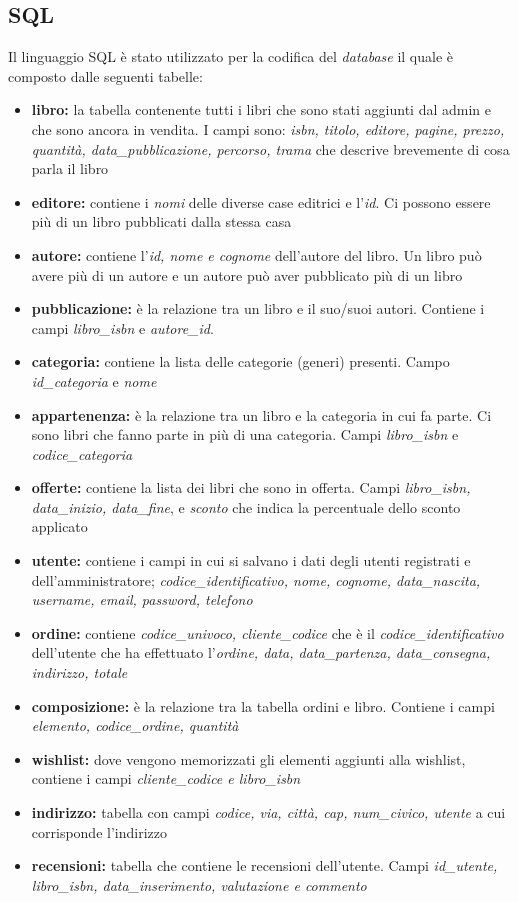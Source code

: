 \subsection{SQL}
Il linguaggio SQL è stato utilizzato per la codifica del \textit{database} il quale è composto dalle seguenti tabelle:
\begin{itemize}
	\item \textbf{libro:} la tabella contenente tutti i libri che sono stati aggiunti dal admin e che sono ancora in vendita. I campi sono: \textit{isbn, titolo, editore, pagine, prezzo, quantità, data\_pubblicazione, percorso, trama} che descrive brevemente di cosa parla il libro
	\item \textbf{editore:} contiene i \textit{nomi} delle diverse case editrici e l’\textit{id}. Ci possono essere più di un libro pubblicati dalla stessa casa
	\item \textbf{autore:} contiene l’\textit{id, nome e cognome} dell'autore del libro. Un libro può avere più di un autore e un autore può aver pubblicato più di un libro
	\item \textbf{pubblicazione:} è la relazione tra un libro e il suo/suoi autori. Contiene i campi \textit{libro\_isbn} e \textit{autore\_id}.
	\item \textbf{categoria:} contiene la lista delle categorie (generi) presenti. Campo \textit{id\_categoria} e \textit{nome}
	\item \textbf{appartenenza:} è la relazione tra un libro e la categoria in cui fa parte. Ci sono libri che fanno parte in più di una categoria. Campi \textit{libro\_isbn} e \textit{codice\_categoria}
	\item \textbf{offerte:} contiene la lista dei libri che sono in offerta. Campi \textit{libro\_isbn, data\_inizio, data\_fine}, e \textit{sconto} che indica la percentuale dello sconto applicato
	\item \textbf{utente:} contiene i campi in cui si salvano i dati degli utenti registrati e dell'amministratore; \textit{codice\_identificativo, nome, cognome, data\_nascita, username, email, password, telefono}
	\item \textbf{ordine:} contiene \textit{codice\_univoco, cliente\_codice} che è il \textit{codice\_identificativo} dell’utente che ha effettuato l’\textit{ordine, data, data\_partenza, data\_consegna, indirizzo, totale}
	\item \textbf{composizione:} è la relazione tra la tabella ordini e libro. Contiene i campi \textit{elemento, codice\_ordine, quantità}
	\item \textbf{wishlist:} dove vengono memorizzati gli elementi aggiunti alla wishlist, contiene i campi \textit{cliente\_codice e libro\_isbn}
	\item \textbf{indirizzo:} tabella con campi \textit{codice, via, città, cap, num\_civico, utente} a cui corrisponde l’indirizzo
	\item \textbf{recensioni:} tabella che contiene le recensioni dell'utente. Campi \textit{id\_utente, libro\_isbn, data\_inserimento, valutazione e commento}
\end{itemize}

